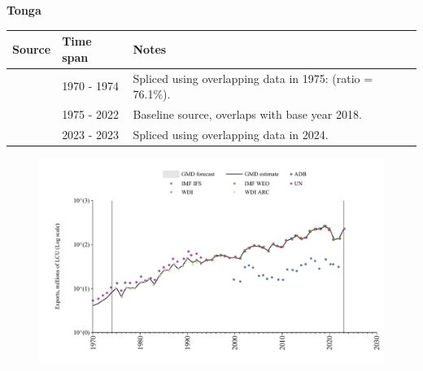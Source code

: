 \documentclass[12pt,a4paper,landscape]{article}
\begin{document}
\begin{adjustbox}{max totalsize={\paperwidth}{\paperheight},center}
\begin{minipage}[t][\textheight][t]{\textwidth}
\vspace*{0.5cm}
{}
\begin{center}
{\Large\bfseries Tonga}
\end{center}
\vspace{0.5cm}
\begin{table}[H]
\centering
\small
\begin{tabular}{|l|l|l|}
\hline
\textbf{Source} & \textbf{Time span} & \textbf{Notes} \\
\hline
\rowcolor{white}\cite{UN}& 1970 - 1974 &Spliced using overlapping data in 1975: (ratio = 76.1\%).\\
\rowcolor{lightgray}\cite{WDI}& 1975 - 2022 &Baseline source, overlaps with base year 2018.\\
\rowcolor{white}\cite{IMF_IFS}& 2023 - 2023 &Spliced using overlapping data in 2024.\\
\hline
\end{tabular}
\end{table}
\begin{figure}[H]
\centering
\includegraphics[width=\textwidth,height=0.6\textheight,keepaspectratio]{graphs/TON_exports.pdf}
\end{figure}
\end{minipage}
\end{adjustbox}
\end{document}
